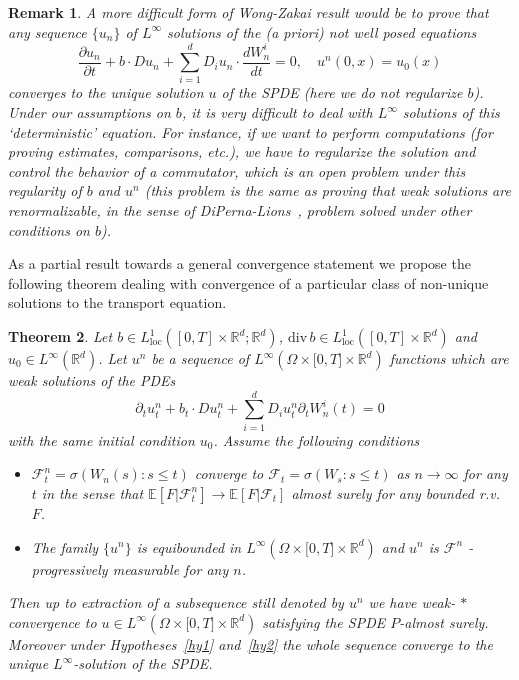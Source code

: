 \documentclass[a4paper,11pt]{article}
\newtheorem{theorem}{Theorem}
\newtheorem{remark}[theorem]{Remark}
\begin{document}
\begin{remark}
\label{remarkWZ} A more difficult form of Wong-Zakai result would be to
prove that any sequence $\{u_{n}\}$ of $L^{\infty }$ solutions of the (a
priori) not well posed equations
\begin{equation*}
\frac{\partial u_{n}}{\partial t}+b\cdot
Du_{n}+\sum_{i=1}^{d}D_{i}u_{n}\cdot \frac{dW_{n}^{i}}{dt}=0,\quad
u^{n}(0,x)=u_{0}(x)
\end{equation*}
converges to the unique solution $u$ of the SPDE (here we do not regularize $%
b$). Under our assumptions on $b$, it is very difficult to deal with $%
L^{\infty }$ solutions of this `deterministic' equation. For instance, if we
want to perform computations (for proving estimates, comparisons, etc.), we
have to regularize the solution and control the behavior of a commutator,
which is an open problem under this regularity of $b$ and $u^{n}$ (this
problem is the same as proving that weak solutions are renormalizable, in
the sense of DiPerna-Lions~\cite{DiPernaLions}, problem solved under other
conditions on $b$).
\end{remark}

As a partial result towards a general convergence statement we propose the
following theorem dealing with convergence of a particular class of
non-unique solutions to the transport equation.

\begin{theorem}
\label{thm WZ 2}Let $b\in L_{\mathrm{loc}}^{1}([0,T]\times \mathbb{R}^{d};%
\mathbb{R}^{d})$, $\mathrm{div}\,b\in L_{\mathrm{loc}}^{1}([0,T]\times
\mathbb{R}^{d})$ and $u_{0}\in L^{\infty }(\mathbb{R}^{d})$. Let $u^{n}$ be
a sequence of $L^{\infty }(\Omega \times \lbrack 0,T]\times \mathbb{R}^{d})$
functions which are weak solutions of the PDEs
\begin{equation}
\partial _{t}u_{t}^{n}+b_{t}\cdot
Du_{t}^{n}+\sum_{i=1}^{d}D_{i}u_{t}^{n}\partial _{t}W_{n}^{i}(t)=0
\label{eq:wz-2}
\end{equation}
with the same initial condition $u_{0}$. Assume the following conditions

\begin{itemize}
\item[(i)]  $\mathcal{F}_{t}^{n}=\sigma (W_{n}(s):s\leq t)$ converge to $%
\mathcal{F}_{t}=\sigma (W_{s}:s\leq t)$ as $n\rightarrow \infty $ for any $t$
in the sense that $\mathbb{E}[F|\mathcal{F}_{t}^{n}]\rightarrow \mathbb{E}[F|%
\mathcal{F}_{t}]$ almost surely for any bounded r.v. $F$.

\item[(ii)]  The family $\{u^{n}\}$ is equibounded in $L^{\infty }(\Omega
\times \lbrack 0,T]\times \mathbb{R}^{d})$ and $u^{n}$ is $\mathcal{F}^{n}$%
-progressively measurable for any $n$.
\end{itemize}

Then up to extraction of a subsequence still denoted by $u^{n}$ we have weak-%
$\ast $ convergence to $u\in L^{\infty }(\Omega \times \lbrack 0,T]\times
\mathbb{R}^{d})$ satisfying the SPDE $P$-almost surely. Moreover under
Hypotheses~\ref{hy1} and~\ref{hy2} the whole sequence converge to the unique
$L^{\infty }$-solution of the SPDE.
\end{theorem}
\end{document}
